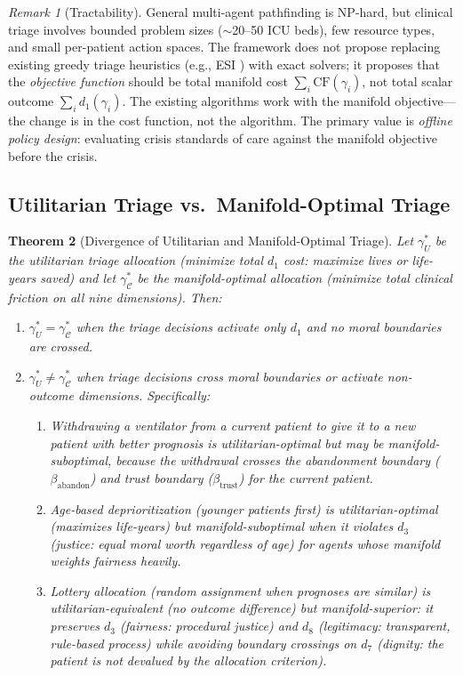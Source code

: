 \documentclass[12pt]{article}
\newtheorem{theorem}{Theorem}[section]
\theoremstyle{definition}
\theoremstyle{remark}
\newtheorem{remark}[theorem]{Remark}
\newcommand{\C}{\mathcal{C}}               %
\newcommand{\CF}{\mathrm{CF}}              %
\begin{document}
\begin{remark}[Tractability]
General multi-agent pathfinding is NP-hard, but clinical triage involves bounded problem sizes ($\sim$20--50 ICU beds), few resource types, and small per-patient action spaces.  The framework does not propose replacing existing greedy triage heuristics (e.g., ESI \cite{gilboy2011}) with exact solvers; it proposes that the \emph{objective function} should be total manifold cost $\sum_i \CF(\gamma_i)$, not total scalar outcome $\sum_i d_1(\gamma_i)$.  The existing algorithms work with the manifold objective---the change is in the cost function, not the algorithm.  The primary value is \emph{offline policy design}: evaluating crisis standards of care against the manifold objective before the crisis.
\end{remark}

\subsection{Utilitarian Triage vs.\ Manifold-Optimal Triage}

\begin{theorem}[Divergence of Utilitarian and Manifold-Optimal Triage]
\label{thm:triage_divergence}
Let $\gamma_U^*$ be the utilitarian triage allocation (minimize total $d_1$ cost: maximize lives or life-years saved) and let $\gamma_\C^*$ be the manifold-optimal allocation (minimize total clinical friction on all nine dimensions).  Then:
\begin{enumerate}
    \item $\gamma_U^* = \gamma_\C^*$ when the triage decisions activate only $d_1$ and no moral boundaries are crossed.
    \item $\gamma_U^* \neq \gamma_\C^*$ when triage decisions cross moral boundaries or activate non-outcome dimensions.  Specifically:
    \begin{enumerate}
        \item Withdrawing a ventilator from a current patient to give it to a new patient with better prognosis is utilitarian-optimal but may be manifold-suboptimal, because the withdrawal crosses the abandonment boundary ($\beta_{\text{abandon}}$) and trust boundary ($\beta_{\text{trust}}$) for the current patient.
        \item Age-based deprioritization (younger patients first) is utilitarian-optimal (maximizes life-years) but manifold-suboptimal when it violates $d_3$ (justice: equal moral worth regardless of age) for agents whose manifold weights fairness heavily.
        \item Lottery allocation (random assignment when prognoses are similar) is utilitarian-equivalent (no outcome difference) but manifold-superior: it preserves $d_3$ (fairness: procedural justice) and $d_8$ (legitimacy: transparent, rule-based process) while avoiding boundary crossings on $d_7$ (dignity: the patient is not devalued by the allocation criterion).
    \end{enumerate}
\end{enumerate}
\end{theorem}
\end{document}
